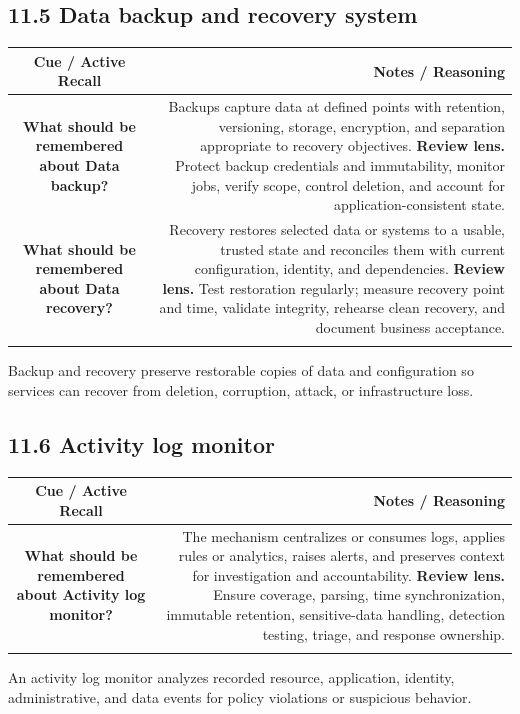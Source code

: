 \documentclass[11pt]{article}
\newcommand{\CornellHeader}{\rowcolor{Navy}\color{white}\bfseries Cue / Active Recall & \color{white}\bfseries Notes / Reasoning \\\endhead}
\newcommand{\CornellRow}[2]{\cellcolor{CueGray}\textbf{#1} & #2 \\\addlinespace[3pt]}
\begin{document}
\subsection{11.5 Data backup and recovery system}
\begin{longtable}{@{}C N@{}}
\CornellHeader
\CornellRow{What should be remembered about Data backup?}{Backups capture data at defined points with retention, versioning, storage, encryption, and separation appropriate to recovery objectives. \textbf{Review lens.} Protect backup credentials and immutability, monitor jobs, verify scope, control deletion, and account for application-consistent state.}
\CornellRow{What should be remembered about Data recovery?}{Recovery restores selected data or systems to a usable, trusted state and reconciles them with current configuration, identity, and dependencies. \textbf{Review lens.} Test restoration regularly; measure recovery point and time, validate integrity, rehearse clean recovery, and document business acceptance.}
\end{longtable}
\begin{sectionsummarybox}
Backup and recovery preserve restorable copies of data and configuration so services can recover from deletion, corruption, attack, or infrastructure loss.
\end{sectionsummarybox}
\subsection{11.6 Activity log monitor}
\begin{longtable}{@{}C N@{}}
\CornellHeader
\CornellRow{What should be remembered about Activity log monitor?}{The mechanism centralizes or consumes logs, applies rules or analytics, raises alerts, and preserves context for investigation and accountability. \textbf{Review lens.} Ensure coverage, parsing, time synchronization, immutable retention, sensitive-data handling, detection testing, triage, and response ownership.}
\end{longtable}
\begin{sectionsummarybox}
An activity log monitor analyzes recorded resource, application, identity, administrative, and data events for policy violations or suspicious behavior.
\end{sectionsummarybox}
\end{document}
